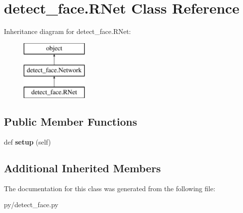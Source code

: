 \hypertarget{classdetect__face_1_1RNet}{}\section{detect\+\_\+face.\+R\+Net Class Reference}
\label{classdetect__face_1_1RNet}
Inheritance diagram for detect\+\_\+face.\+R\+Net\+:\begin{figure}[H]
\begin{center}
\leavevmode
\includegraphics[height=3.000000cm]{classdetect__face_1_1RNet}
\end{center}
\end{figure}
\subsection*{Public Member Functions}
\begin{DoxyCompactItemize}
\item 
def {\bfseries setup} (self)\hypertarget{classdetect__face_1_1RNet_a0e76e16f5e899ed0dc92123676e44410}{}\label{classdetect__face_1_1RNet_a0e76e16f5e899ed0dc92123676e44410}

\end{DoxyCompactItemize}
\subsection*{Additional Inherited Members}


The documentation for this class was generated from the following file\+:\begin{DoxyCompactItemize}
\item 
py/detect\+\_\+face.\+py\end{DoxyCompactItemize}
